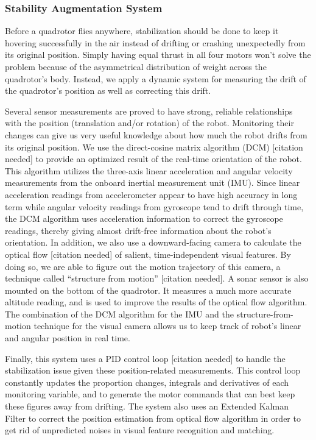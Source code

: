 \documentclass[12pt, letterpaper]{article}
\begin{document}
\subsubsection{Stability Augmentation System}

Before a quadrotor flies anywhere, stabilization should be done to keep it hovering successfully in the air instead of drifting or crashing unexpectedly from its original position. Simply having equal thrust in all four motors won't solve the problem because of the asymmetrical distribution of weight across the quadrotor's body. Instead, we apply a dynamic system for measuring the drift of the quadrotor's position as well as correcting this drift.

Several sensor measurements are proved to have strong, reliable relationships with the position (translation and/or rotation) of the robot. Monitoring their changes can give us very useful knowledge about how much the robot drifts from its original position. We use the direct-cosine matrix algorithm (DCM) [citation needed] to provide an optimized result of the real-time orientation of the robot. This algorithm utilizes the three-axis linear acceleration and angular velocity measurements from the onboard inertial measurement unit (IMU). Since linear acceleration readings from accelerometer appear to have high accuracy in long term while angular velocity readings from gyroscope tend to drift through time, the DCM algorithm uses acceleration information to correct the gyroscope readings, thereby giving almost drift-free information about the robot's orientation. In addition, we also use a downward-facing camera to calculate the optical flow [citation needed] of salient, time-independent visual features. By doing so, we are able to figure out the motion trajectory of this camera, a technique called ``structure from motion'' [citation needed]. A sonar sensor is also mounted on the bottom of the quadrotor. It measures a much more accurate altitude reading, and is used to improve the results of the optical flow algorithm. The combination of the DCM algorithm for the IMU and the structure-from-motion technique for the visual camera allows us to keep track of robot's linear and angular position in real time.

Finally, this system uses a PID control loop [citation needed] to handle the stabilization issue given these position-related measurements. This control loop constantly updates the proportion changes, integrals and derivatives of each monitoring variable, and to generate the motor commands that can best keep these figures away from drifting. The system also uses an Extended Kalman Filter to correct the position estimation from optical flow algorithm in order to get rid of unpredicted noises in visual feature recognition and matching.
\end{document}
